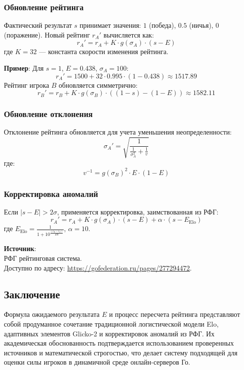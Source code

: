 \documentclass[12pt]{article}
\begin{document}
\subsubsection*{Обновление рейтинга}
Фактический результат \( s \) принимает значения: \( 1 \) (победа), \( 0.5 \) (ничья), \( 0 \) (поражение). Новый рейтинг \( r_A' \) вычисляется как:
\[
r_A' = r_A + K \cdot g(\sigma_A) \cdot (s - E)
\]
где \( K = 32 \) --- константа скорости изменения рейтинга.

\textbf{Пример}: Для \( s = 1 \), \( E = 0.438 \), \( \sigma_A = 100 \):
\[
r_A' = 1500 + 32 \cdot 0.995 \cdot (1 - 0.438) \approx 1517.89
\]
Рейтинг игрока \( B \) обновляется симметрично:
\[
r_B' = r_B + K \cdot g(\sigma_B) \cdot ((1 - s) - (1 - E)) \approx 1582.11
\]

\subsubsection*{Обновление отклонения}
Отклонение рейтинга обновляется для учета уменьшения неопределенности:
\[
\sigma_A' = \sqrt{\frac{1}{\frac{1}{\sigma_A^2} + \frac{1}{v}}}
\]
где:
\[
v^{-1} = g(\sigma_B)^2 \cdot E \cdot (1 - E)
\]

\subsubsection*{Корректировка аномалий}
Если \( |s - E| > 2\sigma \), применяется корректировка, заимствованная из РФГ:
\[
r_A' = r_A + K \cdot g(\sigma_A) \cdot (s - E) + \alpha \cdot (s - E_{\text{Elo}})
\]
где \( E_{\text{Elo}} = \frac{1}{1 + 10^{\frac{(r_B - r_A)}{400}}} \), \( \alpha = 10 \).

\textbf{Источник}: \\
РФГ рейтинговая система. \\
Доступно по адресу: \url{https://gofederation.ru/pages/277294472}.

\subsection*{Заключение}
Формула ожидаемого результата \(E\) и процесс пересчета рейтинга представляют собой продуманное сочетание традиционной логистической модели Elo, адаптивных элементов Glicko-2 и корректировок аномалий из РФГ. Их академическая обоснованность подтверждается использованием проверенных источников и математической строгостью, что делает систему подходящей для оценки силы игроков в динамичной среде онлайн-серверов Го.
\end{document}
